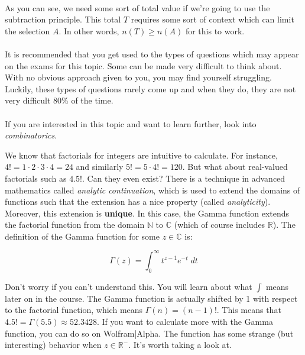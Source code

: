 \documentclass[12pt, a4paper, titlepage, twoside]{article}
\newcommand*{\N}{\mathbb{N}}
\newcommand*{\R}{\mathbb{R}}
\newcommand*{\C}{\mathbb{C}}
\begin{document}
	\paragraph{}
	As you can see, we need some sort of total value if we're going to use the subtraction principle. This total $T$ requires some sort of
	context which can limit the selection $A$. In other words, $n(T) \geq n(A)$ for this to work.
	
	\paragraph{}
	It is recommended that you get used to the types of questions which may appear on the exams for this topic. Some can be made
	very difficult to think about. With no obvious approach given to you, you may find yourself struggling. Luckily, these types of questions
	rarely come up and when they do, they are not very difficult 80\% of the time.
	
	\paragraph{}
	If you are interested in this topic and want to learn further, look into \textit{combinatorics}.\\
	
	\begin{fr}
		We know that factorials for integers are intuitive to calculate. For instance, $4! = 1 \cdot 2 \cdot 3 \cdot 4 = 24$ and
		similarly $5! = 5 \cdot 4! = 120$. But what about real-valued factorials such as $4.5!$. Can they even exist? There is a technique
		in advanced mathematics called \textit{analytic continuation}, which is used to extend the domains of functions such that
		the extension has a nice property (called \textit{analyticity}). Moreover, this extension is \textbf{unique}. In this case, the
		Gamma function extends the factorial function from the domain $\N$ to $\C$ (which of course includes $\R$). The definition of 
		the Gamma function for some $z \in \C$ is:
		
		$$\Gamma(z) = \displaystyle \int_{0}^{\infty} t^{z-1} e^{-t} \; dt$$
		
		Don't worry if you can't understand this. You will learn about what $\displaystyle \int$ means later on in the course. The Gamma
		function is actually shifted by 1 with respect to the factorial function, which means $\Gamma(n) = (n-1)!$. This means that
		$4.5! = \Gamma(5.5) \approx 52.3428$. If you want to calculate more with the Gamma function, you can do so on Wolfram|Alpha. 
		The function has some strange (but interesting) behavior when $z \in \R^-$. It's worth taking a look at.
	\end{fr}
	
\end{document}
